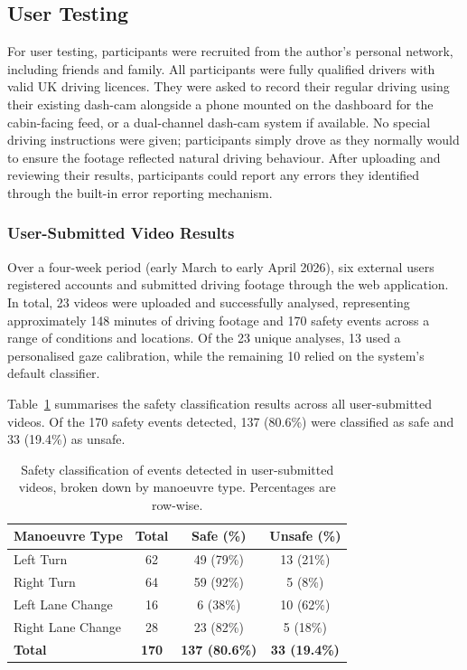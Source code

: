 \documentclass{article}
\begin{document}
\subsection{User Testing}
For user testing, participants were recruited from the author's personal network, including friends and family. All participants were fully qualified drivers with valid UK driving licences. They were asked to record their regular driving using their existing dash-cam alongside a phone mounted on the dashboard for the cabin-facing feed, or a dual-channel dash-cam system if available. No special driving instructions were given; participants simply drove as they normally would to ensure the footage reflected natural driving behaviour. After uploading and reviewing their results, participants could report any errors they identified through the built-in error reporting mechanism.

\subsubsection{User-Submitted Video Results}
Over a four-week period (early March to early April 2026), six external users registered accounts and submitted driving footage through the web application. In total, 23 videos were uploaded and successfully analysed, representing approximately 148 minutes of driving footage and 170 safety events across a range of conditions and locations. Of the 23 unique analyses, 13 used a personalised gaze calibration, while the remaining 10 relied on the system's default classifier.

Table~\ref{tab:user_safety} summarises the safety classification results across all user-submitted videos. Of the 170 safety events detected, 137 (80.6\%) were classified as safe and 33 (19.4\%) as unsafe. 

\begin{table}[H]
\centering
\begin{tabular}{|l|c|c|c|}
\hline
\textbf{Manoeuvre Type} & \textbf{Total} & \textbf{Safe (\%)} & \textbf{Unsafe (\%)} \\
\hline
Left Turn & 62 & 49 (79\%) & 13 (21\%) \\
Right Turn & 64 & 59 (92\%) & 5 (8\%) \\
Left Lane Change & 16 & 6 (38\%) & 10 (62\%) \\
Right Lane Change & 28 & 23 (82\%) & 5 (18\%) \\
\hline
\textbf{Total} & \textbf{170} & \textbf{137 (80.6\%)} & \textbf{33 (19.4\%)} \\
\hline
\end{tabular}
\caption{Safety classification of events detected in user-submitted videos, broken down by manoeuvre type. Percentages are row-wise.}
\label{tab:user_safety}
\end{table}
\end{document}
